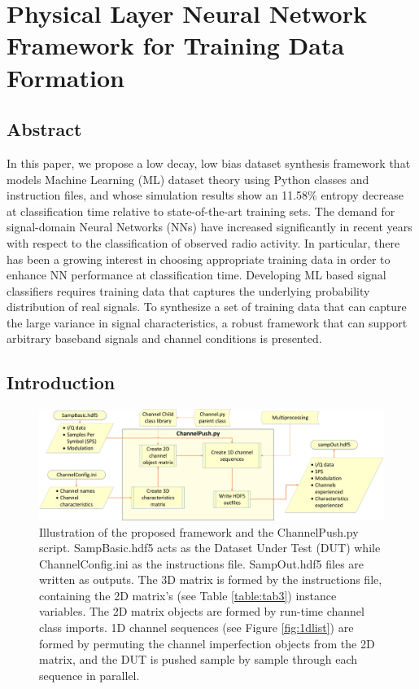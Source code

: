 

\chapter{Physical Layer Neural Network Framework for Training Data Formation}
\label{chapter3}
\section{Abstract}
In this paper, we propose a low decay, low bias dataset synthesis framework that models Machine Learning (ML) dataset theory using Python classes and instruction files, and whose simulation results show an 11.58\% entropy decrease at classification time relative to state-of-the-art training sets. The demand for signal-domain Neural Networks (NNs) have increased significantly in recent years with respect to the classification of observed radio activity. In particular, there has been a growing interest in choosing appropriate training data in order to enhance NN performance at classification time. Developing ML based signal classifiers requires training data that captures the underlying probability distribution of real signals. To synthesize a set of training data that can capture the large variance in signal characteristics, a robust framework that can support arbitrary baseband signals and channel conditions is presented.


\section{Introduction}
\label{sec1}

\begin{figure}[ht!]
	\centering	\includegraphics[width=1\textwidth,keepaspectratio]{figs/channelpush_poster.eps}
    \caption{Illustration of the proposed framework and the ChannelPush.py script. SampBasic.hdf5 acts as the Dataset Under Test (DUT) while ChannelConfig.ini as the instructions file. SampOut.hdf5 files are written as outputs. The 3D matrix is formed by the instructions file, containing the 2D matrix's (see Table \ref{table:tab3}) instance variables. The 2D matrix objects are formed by run-time channel class imports. 1D channel sequences (see Figure \ref{fig:1dlist}) are formed by permuting the channel imperfection objects from the 2D matrix, and the DUT is pushed sample by sample through each sequence in parallel.} 
\label{fig:channeltoolsub}      
\end{figure}

